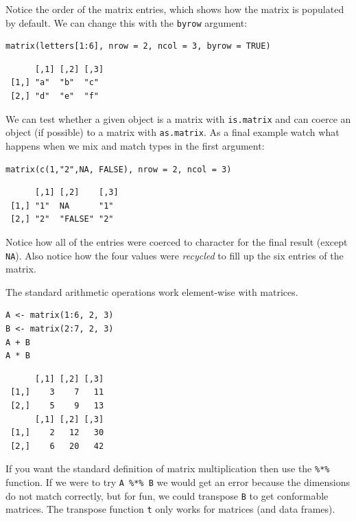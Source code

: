 \documentclass[captions=tableheading]{scrbook}
\begin{document}
\begin{example}
Notice the order of the matrix entries, which shows how the matrix is populated by default. We can change this with the \texttt{byrow} argument:


\lstset{language=R}
\begin{lstlisting}
matrix(letters[1:6], nrow = 2, ncol = 3, byrow = TRUE)
\end{lstlisting}

\begin{verbatim}
      [,1] [,2] [,3]
 [1,] "a"  "b"  "c" 
 [2,] "d"  "e"  "f"
\end{verbatim}

We can test whether a given object is a matrix with \texttt{is.matrix} and can coerce an object (if possible) to a matrix with \texttt{as.matrix}. As a final example watch what happens when we mix and match types in the first argument:


\lstset{language=R}
\begin{lstlisting}
matrix(c(1,"2",NA, FALSE), nrow = 2, ncol = 3)
\end{lstlisting}

\begin{verbatim}
      [,1] [,2]    [,3]
 [1,] "1"  NA      "1" 
 [2,] "2"  "FALSE" "2"
\end{verbatim}

Notice how all of the entries were coerced to character for the final result (except \texttt{NA}). Also notice how the four values were \emph{recycled} to fill up the six entries of the matrix.

The standard arithmetic operations work element-wise with matrices.


\lstset{language=R}
\begin{lstlisting}
A <- matrix(1:6, 2, 3)
B <- matrix(2:7, 2, 3)
A + B
A * B
\end{lstlisting}

\begin{verbatim}
      [,1] [,2] [,3]
 [1,]    3    7   11
 [2,]    5    9   13
      [,1] [,2] [,3]
 [1,]    2   12   30
 [2,]    6   20   42
\end{verbatim}

If you want the standard definition of matrix multiplication then use the \texttt{\%*\%} function. If we were to try \texttt{A \%*\% B} we would get an error because the dimensions do not match correctly, but for fun, we could transpose \texttt{B} to get conformable matrices. The transpose function \texttt{t} only works for matrices (and data frames).



\end{example}
\end{document}
